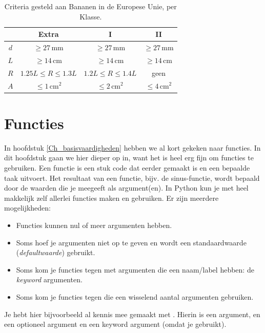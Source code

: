 \documentclass[a4paper,11pt, fleqn]{article}
\newcommand{\ditwc}{Naam van het huidige werkcollege}
\begin{document}
\begin{table}[!ht]
	\centering
	\caption{Criteria gesteld aan Bananen in de Europese Unie, per Klasse.}
	\begin{tabular}{c c c c}
		&\textbf{Extra} & \textbf{I} & \textbf{II}\\
		\hline
		$d$ & $\geq 27\,\textrm{mm}$     &$\geq 27\,\textrm{mm}$    &$\geq 27\,\textrm{mm}$\\
		$L$ & $\geq 14\,\textrm{cm}$     &$\geq 14\,\textrm{cm}$    &$\geq 14\,\textrm{cm}$\\
		$R$ & $1.25 L \leq R \leq 1.3 L$ &$1.2 L \leq R \leq 1.4 L$ & geen\\
		$A$ & $\leq 1\,\textrm{cm}^2$    &$\leq 2\,\textrm{cm}^2$   & $\leq 4\,\textrm{cm}^2$\\
		\hline
	\end{tabular}
\end{table}


\clearpage
\renewcommand{\ditwc}{Functies}
\section[Functies]{\ditwc}
In hoofdstuk \ref{Ch_basisvaardigheden} hebben we al kort gekeken naar functies. In dit hoofdstuk gaan we hier dieper op in, want het is heel erg fijn om functies te gebruiken. Een functie is een stuk code dat eerder gemaakt is en een bepaalde taak uitvoert. Het resultaat van een functie, bijv. de sinus-functie, wordt bepaald door de waarden die je meegeeft als argument(en). In Python kun je met  heel makkelijk zelf allerlei functies maken en gebruiken. Er zijn meerdere mogelijkheden:

\begin{itemize}
\item Functies kunnen nul of meer argumenten hebben. 
\item Soms hoef je argumenten niet op te geven en wordt een standaardwaarde (\textit{defaultwaarde}) gebruikt.
\item Soms kom je functies tegen met argumenten die een naam/label hebben: de \textit{keyword} argumenten. 
\item Soms kom je functies tegen die een wisselend aantal argumenten gebruiken.
\end{itemize}

Je hebt  hier bijvoorbeeld al kennis mee gemaakt met . Hierin is  een argument,  en  een optioneel argument en  een keyword argument (omdat je  gebruikt).
\end{document}
